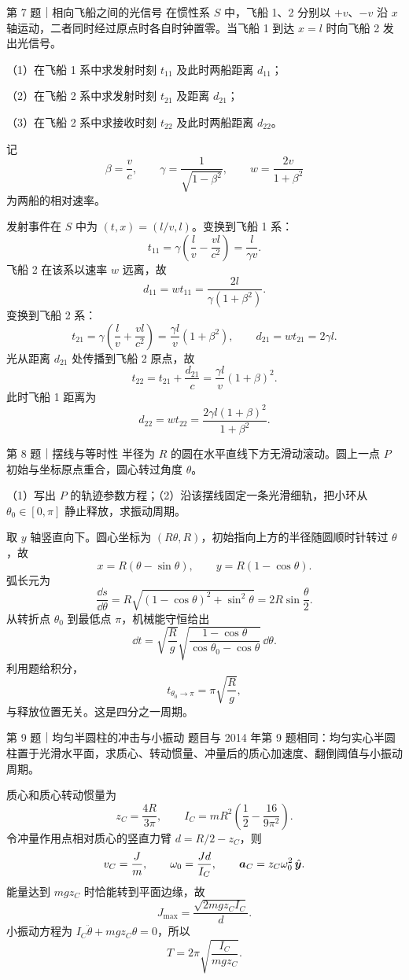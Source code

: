 \begin{problem}{第 7 题｜相向飞船之间的光信号}
在惯性系 $S$ 中，飞船 1、2 分别以 $+v$、$-v$ 沿 $x$ 轴运动，二者同时经过原点时各自时钟置零。当飞船 1 到达 $x=l$ 时向飞船 2 发出光信号。

（1）在飞船 1 系中求发射时刻 $t_{11}$ 及此时两船距离 $d_{11}$；

（2）在飞船 2 系中求发射时刻 $t_{21}$ 及距离 $d_{21}$；

（3）在飞船 2 系中求接收时刻 $t_{22}$ 及此时两船距离 $d_{22}$。
\FigShips
\end{problem}
\begin{solution}
记
\[
\beta=\frac vc,
\qquad
\gamma=\frac1{\sqrt{1-\beta^2}},
\qquad
w=\frac{2v}{1+\beta^2}
\]
为两船的相对速率。

发射事件在 $S$ 中为 $(t,x)=(l/v,l)$。变换到飞船 1 系：
\[
t_{11}=\gamma\left(\frac lv-\frac{vl}{c^2}\right)=\frac{l}{\gamma v}.
\]
飞船 2 在该系以速率 $w$ 远离，故
\[
d_{11}=wt_{11}=\frac{2l}{\gamma(1+\beta^2)}.
\]
变换到飞船 2 系：
\[
t_{21}=\gamma\left(\frac lv+\frac{vl}{c^2}\right)
=\frac{\gamma l}{v}(1+\beta^2),
\qquad
d_{21}=wt_{21}=2\gamma l.
\]
光从距离 $d_{21}$ 处传播到飞船 2 原点，故
\[
t_{22}=t_{21}+\frac{d_{21}}c
=\frac{\gamma l}{v}(1+\beta)^2.
\]
此时飞船 1 距离为
\[
d_{22}=wt_{22}
=\frac{2\gamma l(1+\beta)^2}{1+\beta^2}.
\]
\end{solution}

\begin{problem}{第 8 题｜摆线与等时性}
半径为 $R$ 的圆在水平直线下方无滑动滚动。圆上一点 $P$ 初始与坐标原点重合，圆心转过角度 $\theta$。

（1）写出 $P$ 的轨迹参数方程；（2）沿该摆线固定一条光滑细轨，把小环从 $\theta_0\in[0,\pi]$ 静止释放，求振动周期。
\FigCycloid
\end{problem}
\begin{solution}
取 $y$ 轴竖直向下。圆心坐标为 $(R\theta,R)$，初始指向上方的半径随圆顺时针转过 $\theta$，故
\[
\boxed{x=R(\theta-\sin\theta),\qquad y=R(1-\cos\theta)}.
\]
弧长元为
\[
\frac{\dd s}{\dd\theta}
=R\sqrt{(1-\cos\theta)^2+\sin^2\theta}
=2R\sin\frac\theta2.
\]
从转折点 $\theta_0$ 到最低点 $\pi$，机械能守恒给出
\[
\dd t=\sqrt{\frac Rg}
\sqrt{\frac{1-\cos\theta}{\cos\theta_0-\cos\theta}}\,\dd\theta.
\]
利用题给积分，
\[
t_{\theta_0\to\pi}=\pi\sqrt{\frac Rg},
\]
与释放位置无关。这是四分之一周期。
\end{solution}

\begin{problem}{第 9 题｜均匀半圆柱的冲击与小振动}
题目与 2014 年第 9 题相同：均匀实心半圆柱置于光滑水平面，求质心、转动惯量、冲量后的质心加速度、翻倒阈值与小振动周期。
\FigSemicylinder
\end{problem}
\begin{solution}
质心和质心转动惯量为
\[
z_C=\frac{4R}{3\pi},
\qquad
I_C=mR^2\left(\frac12-\frac{16}{9\pi^2}\right).
\]
令冲量作用点相对质心的竖直力臂 $d=R/2-z_C$，则
\[
v_C=\frac Jm,
\qquad
\omega_0=\frac{Jd}{I_C},
\qquad
\bm{a}_C=z_C\omega_0^2\,\hat{\bm{y}}.
\]
能量达到 $mgz_C$ 时恰能转到平面边缘，故
\[
J_{\max}=\frac{\sqrt{2mgz_CI_C}}d.
\]
小振动方程为 $I_C\ddot\theta+mgz_C\theta=0$，所以
\[
T=2\pi\sqrt{\frac{I_C}{mgz_C}}.
\]
\end{solution}

